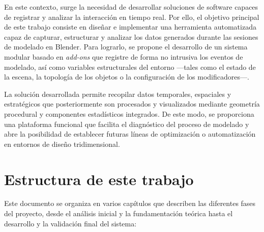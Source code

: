 En este contexto, surge la necesidad de desarrollar soluciones de software capaces de registrar y analizar la interacción en tiempo real. Por ello, el objetivo principal de este trabajo consiste en diseñar e implementar una herramienta automatizada capaz de capturar, estructurar y analizar los datos generados durante las sesiones de modelado en Blender. Para lograrlo, se propone el desarrollo de un sistema modular basado en \textit{add-ons} que registre de forma no intrusiva los eventos de modelado, así como variables estructurales del entorno —tales como el estado de la escena, la topología de los objetos o la configuración de los modificadores—.

La solución desarrollada permite recopilar datos temporales, espaciales y estratégicos que posteriormente son procesados y visualizados mediante geometría procedural y componentes estadísticos integrados. De este modo, se proporciona una plataforma funcional que facilita el diagnóstico del proceso de modelado y abre la posibilidad de establecer futuras líneas de optimización o automatización en entornos de diseño tridimensional.

\section{Estructura de este trabajo}

Este documento se organiza en varios capítulos que describen las diferentes fases del proyecto, desde el análisis inicial y la fundamentación teórica hasta el desarrollo y la validación final del sistema:

